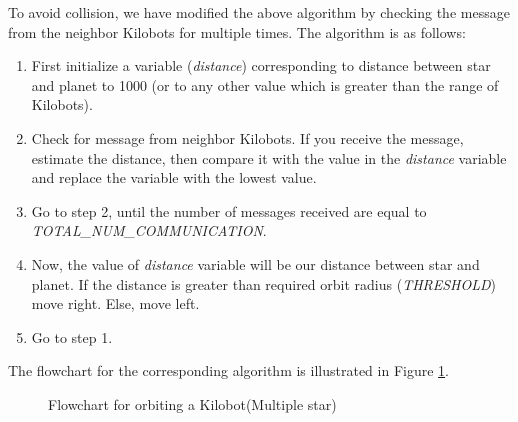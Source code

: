 \documentclass{report}[12pt]
\begin{document}
To avoid collision, we have modified the above algorithm by checking the message from the neighbor Kilobots for multiple times. The algorithm is as follows:

\begin{enumerate}
    \item First initialize a variable ({\it distance}) corresponding to distance between star and planet to 1000 (or to any other value which is greater than the range of Kilobots).
    \item Check for message from neighbor Kilobots. If you receive the message, estimate the distance, then compare it with the value in the {\it distance} variable and replace the variable with the lowest value.
    \item Go to step 2, until the number of messages received are equal to {\it TOTAL\_NUM\_COMMUNICATION}. 
    \item Now, the value of {\it distance} variable will be our distance between star and planet. If the distance is greater than required orbit radius ({\it THRESHOLD}) move right. Else, move left.
    \item Go to step 1.
\end{enumerate}

The flowchart for the corresponding algorithm is illustrated in Figure \ref{fig:Flowchart_for_orbiting_a_Kilobot(Multiple_star)}.

\begin{figure}[H]
	\centering
	\caption{Flowchart for orbiting a Kilobot(Multiple star)}
	\label{fig:Flowchart_for_orbiting_a_Kilobot(Multiple_star)}
\end{figure}
\end{document}
